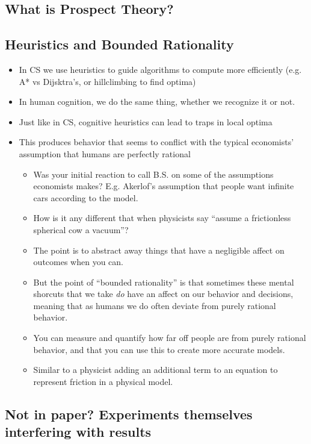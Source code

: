 \documentclass[11pt]{article}
\begin{document}
\subsection{What is Prospect Theory?}

\subsection{Heuristics and Bounded Rationality}

\begin{itemize}
    \item In CS we use heuristics to guide algorithms to compute more efficiently (e.g. A* vs Dijsktra's, or hillclimbing to find optima)
    \item In human cognition, we do the same thing, whether we recognize it or not. 
    \item Just like in CS, cognitive heuristics can lead to traps in local optima
    \item This produces behavior that seems to conflict with the typical economists' assumption that humans are perfectly rational
    \begin{itemize}
        \item Was your initial reaction to call B.S. on some of the assumptions economists makes? E.g. Akerlof's assumption that people want infinite cars according to the model.
        \item How is it any different that when physicists say ``assume a frictionless spherical cow a vacuum''?
        \item The point is to abstract away things that have a negligible affect on outcomes when you can.
        \item But the point of ``bounded rationality'' is that sometimes these mental shorcuts that we take \textit{do} have an affect on our behavior and decisions, meaning that as humans we do often deviate from purely rational behavior.
        \item You can measure and quantify how far off people are from purely rational behavior, and that you can use this to create more accurate models.
        \item Similar to a physicist adding an additional term to an equation to represent friction in a physical model.
    \end{itemize}
\end{itemize}

\subsection{Not in paper? Experiments themselves interfering with results}
\end{document}
